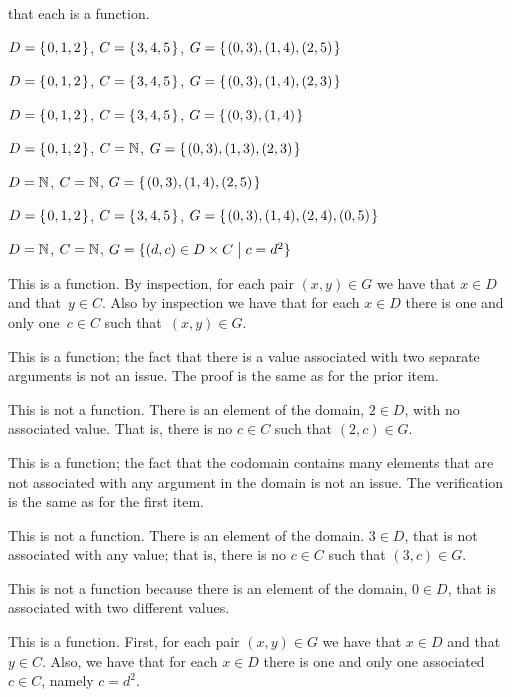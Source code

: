 \documentclass{ibl}
\begin{document}
\begin{ex} \pord{} that each is a function.\label{FindFunctions}
\begin{exes}
\item $D=\mbox{$\{\hspace{0.1em}0,1,2\hspace{0.1em}\}$}$, $C=\mbox{$\{\hspace{0.1em}3,4,5\hspace{0.1em}\}$}$,
  $G=\mbox{$\{\hspace{0.1em}(0,3), (1,4), (2,5)\hspace{0.1em}\}$}$    
\item $D=\mbox{$\{\hspace{0.1em}0,1,2\hspace{0.1em}\}$}$, $C=\mbox{$\{\hspace{0.1em}3,4,5\hspace{0.1em}\}$}$,
  $G=\mbox{$\{\hspace{0.1em}(0,3), (1,4), (2,3)\hspace{0.1em}\}$}$    
\item $D=\mbox{$\{\hspace{0.1em}0,1,2\hspace{0.1em}\}$}$, $C=\mbox{$\{\hspace{0.1em}3,4,5\hspace{0.1em}\}$}$,
  $G=\mbox{$\{\hspace{0.1em}(0,3), (1,4)\hspace{0.1em}\}$}$    
\item $D=\mbox{$\{\hspace{0.1em}0,1,2\hspace{0.1em}\}$}$, $C=\mathbb{N}$,
  $G=\mbox{$\{\hspace{0.1em}(0,3), (1,3), (2,3)\hspace{0.1em}\}$}$    
\item $D=\mathbb{N}$, $C=\mathbb{N}$,
  $G=\mbox{$\{\hspace{0.1em}(0,3), (1,4), (2,5)\hspace{0.1em}\}$}$    
\item $D=\mbox{$\{\hspace{0.1em}0,1,2\hspace{0.1em}\}$}$, $C=\mbox{$\{\hspace{0.1em}3,4,5\hspace{0.1em}\}$}$,
  $G=\mbox{$\{\hspace{0.1em}(0,3), (1,4), (2,4), (0,5)\hspace{0.1em}\}$}$    
\item $D=\mathbb{N}$, $C=\mathbb{N}$,
  $G=\{(d,c)\in D\times C \bigm| c=d^2\}$    
\end{exes}
\begin{ans}
\begin{exes}
\item This is a function.
  By inspection, for each pair $(x,y)\in G$ we have that
  $x\in D$ and that~$y\in C$.
  Also by inspection we have that for each $x\in D$ there is one and only 
  one~$c\in C$ such that~$(x,y)\in G$.  
\item This is a function; the fact that there is a value associated with 
  two separate arguments is not an issue.
  The proof is the same as for the prior item.   
\item This is not a function. 
  There is an element of the domain,
  $2\in D$, with no associated value.
  That is, there is no $c\in C$ such that $(2,c)\in G$. 
\item  This is a function; the fact that the codomain contains many 
  elements that are not associated with any argument in the domain is 
  not an issue.
  The verification is the same as for the first item.  
\item This is not a function.
  There is an element of the domain. $3\in D$, that is not associated with 
  any value; that is, there is no $c\in C$ such that $(3,c)\in G$.   
\item This is not a function because there is an element of the domain,
  $0\in D$, that is associated with two different values.  
\item This is a function. 
  First, for each pair $(x,y)\in G$ we have that
  $x\in D$ and that~$y\in C$.
  Also, we have that for each $x\in D$ there is one and only 
  one associated~$c\in C$, namely $c=d^2$.  
\end{exes}
\end{ans}
\end{ex}
\end{document}
